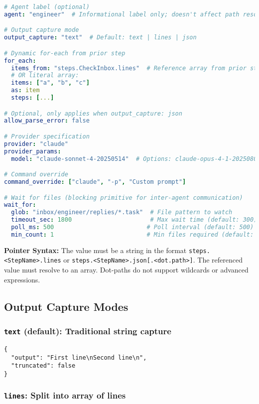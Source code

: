 \documentclass[11pt,a4paper]{article}
\begin{document}
\begin{lstlisting}[language=yaml, caption={Step Schema Fields}]
# Agent label (optional)
agent: "engineer"  # Informational label only; doesn't affect path resolution

# Output capture mode
output_capture: "text"  # Default: text | lines | json

# Dynamic for-each from prior step
for_each:
  items_from: "steps.CheckInbox.lines"  # Reference array from prior step
  # OR literal array:
  items: ["a", "b", "c"]
  as: item
  steps: [...]

# Optional, only applies when output_capture: json
allow_parse_error: false

# Provider specification
provider: "claude"
provider_params:
  model: "claude-sonnet-4-20250514"  # Options: claude-opus-4-1-20250805

# Command override
command_override: ["claude", "-p", "Custom prompt"]

# Wait for files (blocking primitive for inter-agent communication)
wait_for:
  glob: "inbox/engineer/replies/*.task"  # File pattern to watch
  timeout_sec: 1800                      # Max wait time (default: 300)
  poll_ms: 500                          # Poll interval (default: 500)
  min_count: 1                          # Min files required (default: 1)
\end{lstlisting}

\textbf{Pointer Syntax:} The value must be a string in the format \texttt{steps.<StepName>.lines} or \texttt{steps.<StepName>.json[.<dot.path>]}. The referenced value must resolve to an array. Dot-paths do not support wildcards or advanced expressions.

\subsection{Output Capture Modes}

\subsubsection{\texttt{text} (default): Traditional string capture}

\begin{lstlisting}[caption={Text Output Capture}]
{
  "output": "First line\nSecond line\n",
  "truncated": false
}
\end{lstlisting}

\subsubsection{\texttt{lines}: Split into array of lines}
\end{document}
